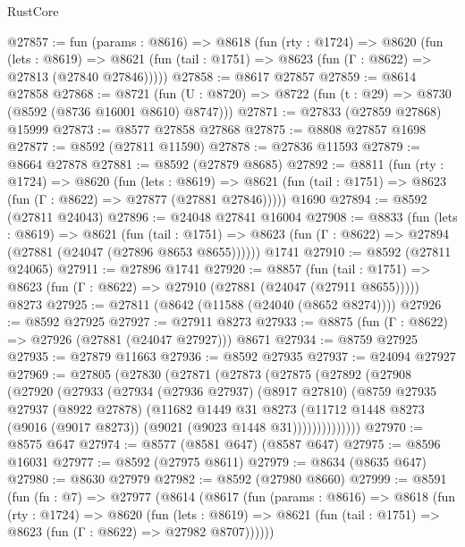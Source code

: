 \begin{lexlean}{RustCore}
\begin{coremodule}
@27857 := fun (params : @8616) =>
  @8618
    (fun (rty : @1724) =>
    @8620
      (fun (lets : @8619) =>
      @8621 (fun (tail : @1751) => @8623 (fun (Γ : @8622) => @27813 (@27840 @27846)))))
@27858 := @8617 @27857
@27859 := @8614 @27858
@27868 := @8721
    (fun (U : @8720) => @8722 (fun (t : @29) => @8730 (@8592 (@8736 @16001 @8610) @8747)))
@27871 := @27833 (@27859 @27868) @15999
@27873 := @8577 @27858 @27868
@27875 := @8808 @27857 @1698
@27877 := @8592 (@27811 @11590)
@27878 := @27836 @11593
@27879 := @8664 @27878
@27881 := @8592 (@27879 @8685)
@27892 := @8811
    (fun (rty : @1724) =>
    @8620
      (fun (lets : @8619) =>
      @8621 (fun (tail : @1751) => @8623 (fun (Γ : @8622) => @27877 (@27881 @27846)))))
    @1690
@27894 := @8592 (@27811 @24043)
@27896 := @24048 @27841 @16004
@27908 := @8833
    (fun (lets : @8619) =>
    @8621
      (fun (tail : @1751) =>
      @8623 (fun (Γ : @8622) => @27894 (@27881 (@24047 (@27896 @8653 @8655))))))
    @1741
@27910 := @8592 (@27811 @24065)
@27911 := @27896 @1741
@27920 := @8857
    (fun (tail : @1751) => @8623 (fun (Γ : @8622) => @27910 (@27881 (@24047 (@27911 @8655)))))
    @8273
@27925 := @27811 (@8642 (@11588 (@24040 (@8652 @8274))))
@27926 := @8592 @27925
@27927 := @27911 @8273
@27933 := @8875 (fun (Γ : @8622) => @27926 (@27881 (@24047 @27927))) @8671
@27934 := @8759 @27925
@27935 := @27879 @11663
@27936 := @8592 @27935
@27937 := @24094 @27927
@27969 := @27805
    (@27830
      (@27871
        (@27873
          (@27875
            (@27892
              (@27908
                (@27920
                  (@27933
                    (@27934
                      (@27936 @27937)
                      (@8917 @27810)
                      (@8759
                        @27935
                        @27937
                        (@8922 @27878)
                        (@11682
                          @1449
                          @31
                          @8273
                          (@11712
                            @1448
                            @8273
                            (@9016 (@9017 @8273))
                            (@9021 (@9023 @1448 @31))))))))))))))
@27970 := @8575 @647
@27974 := @8577 (@8581 @647) (@8587 @647)
@27975 := @8596 @16031
@27977 := @8592 (@27975 @8611)
@27979 := @8634 (@8635 @647)
@27980 := @8630 @27979
@27982 := @8592 (@27980 @8660)
@27999 := @8591
    (fun (fn : @7) =>
    @27977
      (@8614
        (@8617
          (fun (params : @8616) =>
          @8618
            (fun (rty : @1724) =>
            @8620
              (fun (lets : @8619) =>
              @8621 (fun (tail : @1751) => @8623 (fun (Γ : @8622) => @27982 @8707))))))

\end{coremodule}
\end{lexlean}
